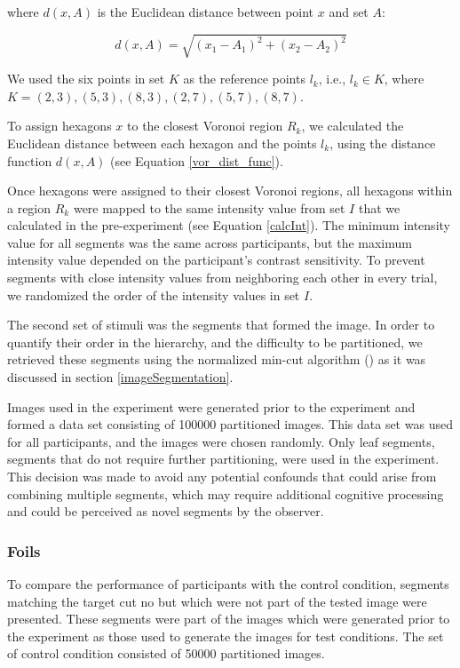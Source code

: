 \documentclass{article}
\begin{document}
where $d(x, A)$ is the Euclidean distance between point $x$ and set $A$:

\begin{equation} \label{vor_dist_func}
d(x, A) = \sqrt{(x_1 - A_1)^2 + (x_2 - A_2)^2}
\end{equation}

We used the six points in set $K$ as the reference points $l_k$, i.e., $l_k \in K$, where $K = {(2,3), (5,3), (8,3), (2,7), (5,7), (8,7)}$.


To assign hexagons $x$ to the closest Voronoi region $R_k$, we calculated the Euclidean distance between each hexagon and the points $l_k$, using the distance function $d(x,A)$ (see Equation \ref{vor_dist_func}).

Once hexagons were assigned to their closest Voronoi regions, all hexagons within a region $R_k$ were mapped to the same intensity value from set $I$ that we calculated in the pre-experiment (see Equation \ref{calcInt}). The minimum intensity value for all segments was the same across participants, but the maximum intensity value depended on the participant's contrast sensitivity. To prevent segments with close intensity values from neighboring each other in every trial, we randomized the order of the intensity values in set $I$.  

The second set of stimuli was the segments that formed the image. In order to quantify their order in the hierarchy, and the difficulty to be partitioned, we retrieved these segments using the normalized min-cut algorithm (\cite{RN165}) as it was discussed in section \ref{imageSegmentation}.

Images used in the experiment were generated prior to the experiment and formed a data set consisting of 100000 partitioned images. This data set was used for all participants, and the images were chosen randomly. Only leaf segments, segments that do not require further partitioning, were used in the experiment. This decision was made to avoid any potential confounds that could arise from combining multiple segments, which may require additional cognitive processing and could be perceived as novel segments by the observer.

\subsubsection{Foils}
To compare the performance of participants with the control condition, segments matching the target cut no but which were not part of the tested image were presented. These segments were part of the images which were generated prior to the experiment as those used to generate the images for test conditions. The set of control condition consisted of 50000 partitioned images.
\end{document}
